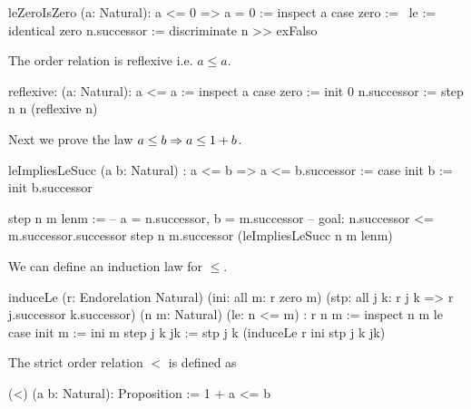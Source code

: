 \begin{alba}
    leZeroIsZero (a: Natural): a <= 0 => a = 0 :=
        inspect a case
            zero :=
                \ le := identical zero
            n.successor :=
                discriminate n >> exFalso
\end{alba}





\noindent The order relation is reflexive i.e. $a \le a$.

\begin{alba}
    reflexive: (a: Natural): a <= a :=
        inspect a case
            zero :=
                init 0
            n.successor :=
                step n n (reflexive n)
\end{alba}





\noindent Next we prove the law $a \le b \Rightarrow a \le 1 + b$.

\begin{alba}
    leImpliesLeSucc
        (a b: Natural)
        :  a <= b  =>  a <= b.successor
    :=
        case
            init b :=
                init b.successor

            step n m lenm :=
                -- a = n.successor, b = m.successor
                -- goal: n.successor <= m.successor.successor
                step
                    n
                    m.successor
                    (leImpliesLeSucc n m lenm)
\end{alba}


We can define an induction law for $\le$.

\begin{alba}
    induceLe
        (r: Endorelation Natural)
        (ini: all m: r zero m)
        (stp: all j k: r j k => r j.successor k.successor)
        (n m: Natural)
        (le: n <= m)
        : r n m
    :=
        inspect n m le case
            init m :=
                ini m
            step j k jk :=
                stp j k (induceLe r ini stp j k jk)
\end{alba}


\noindent The strict order relation $<$ is defined as

\begin{alba}
  (<) (a b: Natural): Proposition :=
    1 + a <= b
\end{alba}






